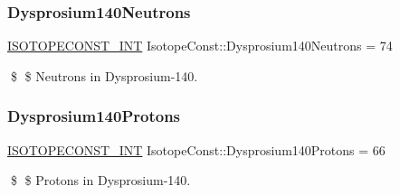 \subsubsection{\texorpdfstring{Dysprosium140\+Neutrons}{Dysprosium140Neutrons}}
{\footnotesize\ttfamily \mbox{\hyperlink{group___isotope_const-_macros_ga5f18360b3e99483a35c32d789e62621c}{I\+S\+O\+T\+O\+P\+E\+C\+O\+N\+S\+T\+\_\+\+I\+NT}} Isotope\+Const\+::\+Dysprosium140\+Neutrons = 74}

\$ \$ Neutrons in Dysprosium-\/140. \mbox{\label{group___isotope_const-_dysprosium-_dy140_gaae258190e58a4f8bfafb60b02de7dd8f}} 
\subsubsection{\texorpdfstring{Dysprosium140\+Protons}{Dysprosium140Protons}}
{\footnotesize\ttfamily \mbox{\hyperlink{group___isotope_const-_macros_ga5f18360b3e99483a35c32d789e62621c}{I\+S\+O\+T\+O\+P\+E\+C\+O\+N\+S\+T\+\_\+\+I\+NT}} Isotope\+Const\+::\+Dysprosium140\+Protons = 66}

\$ \$ Protons in Dysprosium-\/140. 
